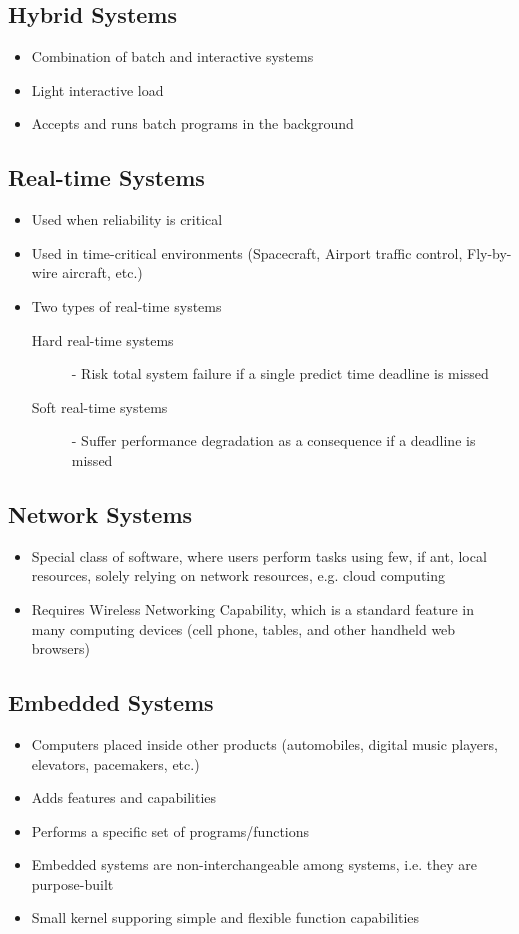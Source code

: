\documentclass[12pt letter]{report}
\begin{document}
\subsection{Hybrid Systems}
\begin{itemize}
  \item Combination of batch and interactive systems
  \item Light interactive load
  \item Accepts and runs batch programs in the background
\end{itemize}

\subsection{Real-time Systems}
\begin{itemize}
  \item Used when reliability is critical
  \item Used in time-critical environments (Spacecraft, Airport traffic control, Fly-by-wire aircraft, etc.)
  \item Two types of real-time systems
        \begin{description}
          \item[Hard real-time systems] - Risk total system failure if a single predict time deadline is missed
          \item[Soft real-time systems] - Suffer performance degradation as a consequence if a deadline is missed
        \end{description}
\end{itemize}

\subsection{Network Systems}

\begin{itemize}
  \item Special class of software, where users perform tasks using few, if ant, local resources, solely relying on network resources, e.g. cloud computing
  \item Requires Wireless Networking Capability, which is a standard feature in many computing devices (cell phone, tables, and other handheld web browsers)
\end{itemize}

\subsection{Embedded Systems}
\begin{itemize}
  \item Computers placed inside other products (automobiles, digital music players, elevators, pacemakers, etc.)
  \item Adds features and capabilities
  \item Performs a specific set of programs/functions
  \item Embedded systems are  non-interchangeable among systems, i.e. they are purpose-built
  \item Small kernel supporing simple and flexible function capabilities
\end{itemize}
\end{document}
